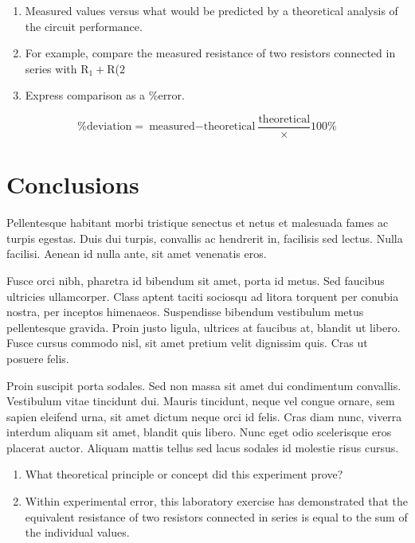 \documentclass{article}
\begin{document}
\begin{enumerate}{}{}
  \item Measured values versus what would be predicted by a theoretical
    analysis of the circuit performance.
  \item For example, compare the measured resistance of two resistors connected
    in series with R$_1 + $R($2$
  \item Express comparison as a \%error.
\end{enumerate}

\[\text{\%deviation} = {\text{measured} - \text{theoretical}} \frac
  {\text{theoretical}} \times \text{100\%}\]

\section{Conclusions}
Pellentesque habitant morbi tristique senectus et netus et malesuada fames ac
turpis egestas. Duis dui turpis, convallis ac hendrerit in, facilisis sed
lectus. Nulla facilisi. Aenean id nulla ante, sit amet venenatis eros.

Fusce orci nibh, pharetra id bibendum sit amet, porta id metus. Sed faucibus
ultricies ullamcorper. Class aptent taciti sociosqu ad litora torquent per
conubia nostra, per inceptos himenaeos. Suspendisse bibendum vestibulum metus
pellentesque gravida. Proin justo ligula, ultrices at faucibus at, blandit ut
libero. Fusce cursus commodo nisl, sit amet pretium velit dignissim quis. Cras
ut posuere felis.

Proin suscipit porta sodales. Sed non massa sit amet dui condimentum convallis.
Vestibulum vitae tincidunt dui. Mauris tincidunt, neque vel congue ornare, sem
sapien eleifend urna, sit amet dictum neque orci id felis. Cras diam nunc,
viverra interdum aliquam sit amet, blandit quis libero. Nunc eget odio
scelerisque eros placerat auctor. Aliquam mattis tellus sed lacus sodales id
molestie risus cursus.

\begin{enumerate}{}
  \item What theoretical principle or concept did this experiment prove?
  \item Within experimental error, this laboratory exercise has demonstrated that
    the equivalent resistance of two resistors connected in series is equal to the
    sum of the individual values.
\end{enumerate}
\end{document}

